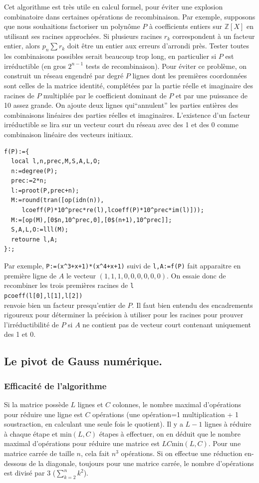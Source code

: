 \documentclass[a4paper,11pt]{article}
\newcommand{\Z}{{\mathbb{Z}}}
\begin{document}
\begin{giacjshere}
Cet algorithme est tr\`es utile en calcul formel, pour \'eviter
une explosion combinatoire dans certaines
op\'erations de recombinaison. Par exemple, supposons que
nous souhaitions factoriser un polyn\^ome $P$ \`a coefficients
entiers sur $\Z[X]$ en utilisant ses racines approch\'ees. Si
plusieurs racines $r_k$ correspondent \`a un facteur entier,
alors $p_n \sum r_k $ doit \^etre un entier aux erreurs
d'arrondi pr\`es. Tester toutes les combinaisons possibles
serait beaucoup trop long, en particulier si $P$ est irr\'eductible
(en gros $2^{n-1}$ tests de recombinaison). Pour \'eviter ce
probl\`eme, on construit un r\'eseau engendr\'e par degr\'e $P$ 
lignes dont les premi\`eres coordonn\'ees sont celles de la
matrice identit\'e, compl\'et\'ees par la partie r\'eelle et
imaginaire des racines de $P$ multipli\'ee par le coefficient dominant
de $P$ et par une puissance de 10 assez grande. On ajoute
deux lignes qui``annulent'' les parties enti\`eres des combinaisons
lin\'eaires des parties r\'eelles et imaginaires.
L'existence
d'un facteur irr\'eductible se lira sur un vecteur court du r\'eseau
avec des 1 et des 0 comme combinaison lin\'eaire des vecteurs
initiaux.
\begin{verbatim}
f(P):={
  local l,n,prec,M,S,A,L,O;
  n:=degree(P);
  prec:=2*n;
  l:=proot(P,prec+n);
  M:=round(tran([op(idn(n)),
     lcoeff(P)*10^prec*re(l),lcoeff(P)*10^prec*im(l)]));
  M:=[op(M),[0$n,10^prec,0],[0$(n+1),10^prec]];
  S,A,L,O:=lll(M);
  retourne l,A;
}:;
\end{verbatim}
Par exemple, \verb|P:=(x^3+x+1)*(x^4+x+1)| suivi de \verb|l,A:=f(P)|
fait apparaitre en premi\`ere ligne de $A$ le vecteur
$(1,1,1,0,0,0,0,0,0)$. On essaie donc de recombiner les trois
premi\`eres racines de \verb|l|\\
\verb|pcoeff(l[0],l[1],l[2])|\\
renvoie bien un facteur presqu'entier de $P$. Il faut bien entendu des
encadrements rigoureux pour d\'eterminer la pr\'ecision \`a utiliser
pour les racines pour prouver l'irr\'eductibilit\'e de $P$ si $A$ ne
contient pas de vecteur court contenant uniquement des 1 et 0.

\subsection{Le pivot de Gauss num\'erique.}
\subsubsection{Efficacité de l'algorithme}
Si la matrice possède $L$ lignes et $C$ colonnes,
le nombre maximal d'opérations pour réduire une ligne est 
$C$ op\'erations (une op\'eration=1 multiplication + 1 soustraction, 
en calculant une seule fois le quotient). 
Il y a $L-1$ lignes à réduire à chaque
étape et min$(L,C)$ étapes à effectuer, on en déduit que le
nombre maximal d'opérations pour réduire une matrice est
$LC$min$(L,C)$. Pour une matrice carrée de taille $n$, cela fait 
$n^3$ opérations.  Si on effectue une r\'eduction en-dessous de la diagonale, 
toujours pour une matrice carr\'ee, le nombre d'op\'erations est
divis\'e par 3 ($\sum_{k=2}^n k^2$).


\end{giacjshere}
\end{document}

